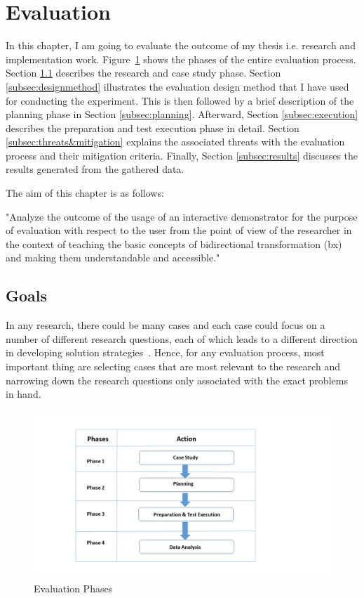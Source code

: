 \section{Evaluation}\label{sec:evaluation} 
In this chapter, I am going to evaluate the outcome of my thesis i.e. research and implementation work. 
Figure~\ref{fig:Evaluation_Phases} shows the phases of the entire evaluation process. Section \ref{subsec:goals} describes the research and case study phase. Section \ref{subsec:designmethod} illustrates the evaluation design method that I have used for conducting the experiment. This is then followed by a brief description of the planning phase in Section \ref{subsec:planning}. Afterward, Section \ref{subsec:execution} describes the preparation and test execution phase in detail. Section \ref{subsec:threats&mitigation} explains the associated threats with the evaluation process and their mitigation criteria. Finally, Section \ref{subsec:results} discusses the results generated from the gathered data. 

The aim of this chapter is as follows: 

"Analyze the outcome of the usage of an interactive demonstrator for the purpose of evaluation with respect to the user from the point of view of the researcher in the context of teaching the basic concepts of bidirectional transformation (bx) and making them understandable and accessible."

\subsection{Goals}\label{subsec:goals}  
In any research, there could be many cases and each case could focus on a number of different research questions, each of which leads to a different direction in developing solution strategies~\cite{semethods}. Hence, for any evaluation process, most important thing are selecting cases that are most relevant to the research and narrowing down the research questions only associated with the exact problems in hand. 

\begin{figure}
	\includegraphics[width=1\textwidth]{figures/Evaluation_Phases}
	\caption{Evaluation Phases}
	\label{fig:Evaluation_Phases}
\end{figure}

